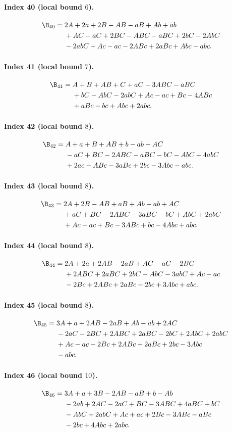 \paragraph{Index 40 (local bound $6$).}
\begin{align*}
\B_{40}={}&2A +2a +2B -AB -aB +Ab +ab\\
&{}+AC +aC +2BC -ABC -aBC +2bC -2AbC\\
&{}-2abC +Ac -ac -2ABc +2aBc +Abc -abc.
\end{align*}
\paragraph{Index 41 (local bound $7$).}
\begin{align*}
\B_{41}={}&A +B +AB +C +aC -3ABC -aBC\\
&{}+bC -AbC -2abC +Ac -ac +Bc -4ABc\\
&{}+aBc -bc +Abc +2abc.
\end{align*}
\paragraph{Index 42 (local bound $8$).}
\begin{align*}
\B_{42}={}&A +a +B +AB +b -ab +AC\\
&{}-aC +BC -2ABC -aBC -bC -AbC +4abC\\
&{}+2ac -ABc -3aBc +2bc -3Abc -abc.
\end{align*}
\paragraph{Index 43 (local bound $8$).}
\begin{align*}
\B_{43}={}&2A +2B -AB +aB +Ab -ab +AC\\
&{}+aC +BC -2ABC -3aBC -bC +AbC +2abC\\
&{}+Ac -ac +Bc -3ABc +bc -4Abc +abc.
\end{align*}
\paragraph{Index 44 (local bound $8$).}
\begin{align*}
\B_{44}={}&2A +2a +2AB -2aB +AC -aC -2BC\\
&{}+2ABC +2aBC +2bC -AbC -3abC +Ac -ac\\
&{}-2Bc +2ABc +2aBc -2bc +3Abc +abc.
\end{align*}
\paragraph{Index 45 (local bound $8$).}
\begin{align*}
\B_{45}={}&3A +a +2AB -2aB +Ab -ab +2AC\\
&{}-2aC -2BC +2ABC +2aBC -2bC +2AbC +2abC\\
&{}+Ac -ac -2Bc +2ABc +2aBc +2bc -3Abc\\
&{}-abc.
\end{align*}
\paragraph{Index 46 (local bound $10$).}
\begin{align*}
\B_{46}={}&3A +a +3B -2AB -aB +b -Ab\\
&{}-2ab +2AC -2aC +BC -3ABC +4aBC +bC\\
&{}-AbC +2abC +Ac +ac +2Bc -3ABc -aBc\\
&{}-2bc +4Abc +2abc.
\end{align*}
